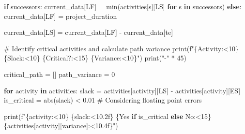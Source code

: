 \documentclass[
  letterpaper,
  DIV=11,
  numbers=noendperiod]{scrreprt}
\newenvironment{Shaded}{\begin{snugshade}}{\end{snugshade}}
\newcommand{\BuiltInTok}[1]{\textcolor[rgb]{0.00,0.23,0.31}{#1}}
\newcommand{\CommentTok}[1]{\textcolor[rgb]{0.37,0.37,0.37}{#1}}
\newcommand{\ControlFlowTok}[1]{\textcolor[rgb]{0.00,0.23,0.31}{\textbf{#1}}}
\newcommand{\DecValTok}[1]{\textcolor[rgb]{0.68,0.00,0.00}{#1}}
\newcommand{\FloatTok}[1]{\textcolor[rgb]{0.68,0.00,0.00}{#1}}
\newcommand{\KeywordTok}[1]{\textcolor[rgb]{0.00,0.23,0.31}{\textbf{#1}}}
\newcommand{\NormalTok}[1]{\textcolor[rgb]{0.00,0.23,0.31}{#1}}
\newcommand{\OperatorTok}[1]{\textcolor[rgb]{0.37,0.37,0.37}{#1}}
\newcommand{\SpecialCharTok}[1]{\textcolor[rgb]{0.37,0.37,0.37}{#1}}
\newcommand{\SpecialStringTok}[1]{\textcolor[rgb]{0.13,0.47,0.30}{#1}}
\newcommand{\StringTok}[1]{\textcolor[rgb]{0.13,0.47,0.30}{#1}}
\begin{document}
\begin{Shaded}
\begin{Highlighting}[]
        \ControlFlowTok{if}\NormalTok{ successors:}
\NormalTok{            current\_data[}\StringTok{\textquotesingle{}LF\textquotesingle{}}\NormalTok{] }\OperatorTok{=} \BuiltInTok{min}\NormalTok{(activities[s][}\StringTok{\textquotesingle{}LS\textquotesingle{}}\NormalTok{] }\ControlFlowTok{for}\NormalTok{ s }\KeywordTok{in}\NormalTok{ successors)}
        \ControlFlowTok{else}\NormalTok{:}
\NormalTok{            current\_data[}\StringTok{\textquotesingle{}LF\textquotesingle{}}\NormalTok{] }\OperatorTok{=}\NormalTok{ project\_duration}
            
\NormalTok{        current\_data[}\StringTok{\textquotesingle{}LS\textquotesingle{}}\NormalTok{] }\OperatorTok{=}\NormalTok{ current\_data[}\StringTok{\textquotesingle{}LF\textquotesingle{}}\NormalTok{] }\OperatorTok{{-}}\NormalTok{ current\_data[}\StringTok{\textquotesingle{}te\textquotesingle{}}\NormalTok{]}
    
    \CommentTok{\# Identify critical activities and calculate path variance}
    \BuiltInTok{print}\NormalTok{(}\SpecialStringTok{f"}\SpecialCharTok{\{}\StringTok{\textquotesingle{}Activity\textquotesingle{}}\SpecialCharTok{:\textless{}10\}}\SpecialStringTok{ }\SpecialCharTok{\{}\StringTok{\textquotesingle{}Slack\textquotesingle{}}\SpecialCharTok{:\textless{}10\}}\SpecialStringTok{ }\SpecialCharTok{\{}\StringTok{\textquotesingle{}Critical?\textquotesingle{}}\SpecialCharTok{:\textless{}15\}}\SpecialStringTok{ }\SpecialCharTok{\{}\StringTok{\textquotesingle{}Variance\textquotesingle{}}\SpecialCharTok{:\textless{}10\}}\SpecialStringTok{"}\NormalTok{)}
    \BuiltInTok{print}\NormalTok{(}\StringTok{"{-}"} \OperatorTok{*} \DecValTok{45}\NormalTok{)}
    
\NormalTok{    critical\_path }\OperatorTok{=}\NormalTok{ []}
\NormalTok{    path\_variance }\OperatorTok{=} \DecValTok{0}
    
    \ControlFlowTok{for}\NormalTok{ activity }\KeywordTok{in}\NormalTok{ activities:}
\NormalTok{        slack }\OperatorTok{=}\NormalTok{ activities[activity][}\StringTok{\textquotesingle{}LS\textquotesingle{}}\NormalTok{] }\OperatorTok{{-}}\NormalTok{ activities[activity][}\StringTok{\textquotesingle{}ES\textquotesingle{}}\NormalTok{]}
\NormalTok{        is\_critical }\OperatorTok{=} \BuiltInTok{abs}\NormalTok{(slack) }\OperatorTok{\textless{}} \FloatTok{0.01}  \CommentTok{\# Considering floating point errors}
        
        \BuiltInTok{print}\NormalTok{(}\SpecialStringTok{f"}\SpecialCharTok{\{}\NormalTok{activity}\SpecialCharTok{:\textless{}10\}}\SpecialStringTok{ }\SpecialCharTok{\{}\NormalTok{slack}\SpecialCharTok{:\textless{}10.2f\}}\SpecialStringTok{ }\SpecialCharTok{\{}\StringTok{\textquotesingle{}Yes\textquotesingle{}} \ControlFlowTok{if}\NormalTok{ is\_critical }\ControlFlowTok{else} \StringTok{\textquotesingle{}No\textquotesingle{}}\SpecialCharTok{:\textless{}15\}}\SpecialStringTok{ }\SpecialCharTok{\{}\NormalTok{activities[activity][}\StringTok{\textquotesingle{}variance\textquotesingle{}}\NormalTok{]}\SpecialCharTok{:\textless{}10.4f\}}\SpecialStringTok{"}\NormalTok{)}
        

\end{Highlighting}
\end{Shaded}
\end{document}
